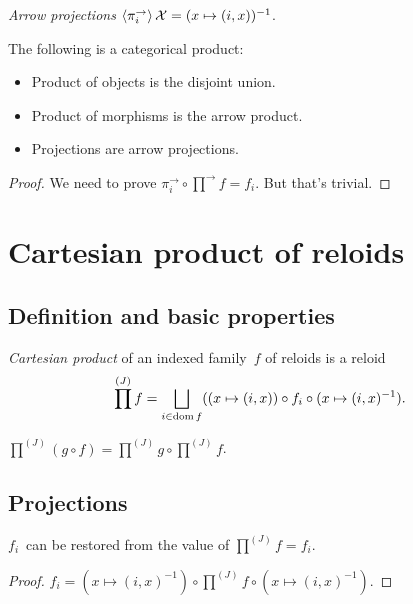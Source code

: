 \begin{defn}
\emph{Arrow projections}
$\left\langle \pi^{\rightarrow}_i\right\rangle\mathcal{X} = (x\mapsto(i,x))^{-1}$.
\end{defn}

\begin{thm}
The following is a categorical product:
\begin{itemize}
\item Product of objects is the disjoint union.
\item Product of morphisms is the arrow product.
\item Projections are arrow projections.
\end{itemize}
\end{thm}

\begin{proof}
We need to prove $\pi^{\rightarrow}_i\circ\prod^{\rightarrow}f=f_i$. But that's trivial.
\end{proof}

\section{Cartesian product of reloids}

\subsection{Definition and basic properties}

\begin{defn}
\emph{Cartesian product} of an indexed family~$f$ of reloids is
a reloid \[ \prod^{(J)} f=\bigsqcup_{i\in\dom f}((x\mapsto(i,x))\circ f_i\circ(x\mapsto(i,x)^{-1}). \]
\end{defn}

\begin{conjecture}
$\prod^{(J)}(g\circ f)=\prod^{(J)}g\circ\prod^{(J)}f$.
\end{conjecture}

\subsection{Projections}

\begin{thm}
$f_i$~can be restored from the value of $\prod^{(J)}f=f_i$.
\end{thm}

\begin{proof}
$f_i = (x\mapsto(i,x)^{-1})\circ\prod^{(J)}f\circ(x\mapsto(i,x)^{-1})$.
\end{proof}

